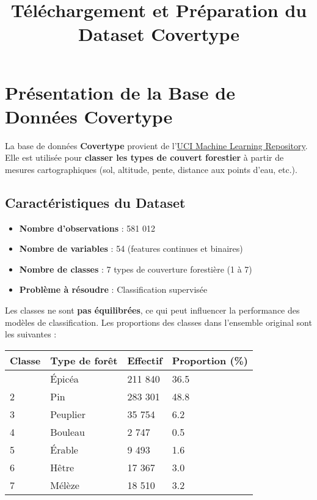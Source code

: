 \documentclass[
]{article}
\title{Téléchargement et Préparation du Dataset Covertype}
\author{}
\date{}
\providecommand{\tightlist}{%
  \setlength{\itemsep}{0pt}\setlength{\parskip}{0pt}}\usepackage{longtable,booktabs,array}
\begin{document}
\maketitle


\section{Présentation de la Base de Données
Covertype}\label{pruxe9sentation-de-la-base-de-donnuxe9es-covertype}

La base de données \textbf{Covertype} provient de
l'\href{https://archive.ics.uci.edu/ml/datasets/Covertype}{UCI Machine
Learning Repository}. Elle est utilisée pour \textbf{classer les types
de couvert forestier} à partir de mesures cartographiques (sol,
altitude, pente, distance aux points d'eau, etc.).

\subsection{Caractéristiques du
Dataset}\label{caractuxe9ristiques-du-dataset}

\begin{itemize}
\tightlist
\item
  \textbf{Nombre d'observations} : 581 012
\item
  \textbf{Nombre de variables} : 54 (features continues et binaires)
\item
  \textbf{Nombre de classes} : 7 types de couverture forestière (1 à 7)
\item
  \textbf{Problème à résoudre} : Classification supervisée
\end{itemize}

Les classes ne sont \textbf{pas équilibrées}, ce qui peut influencer la
performance des modèles de classification. Les proportions des classes
dans l'ensemble original sont les suivantes :

\begin{longtable}[]{@{}llll@{}}
\toprule\noalign{}
Classe & Type de forêt & Effectif & Proportion (\%) \\
\midrule\noalign{}
\endhead
\bottomrule\noalign{}
\endlastfoot
1 & Épicéa & 211 840 & 36.5 \\
2 & Pin & 283 301 & 48.8 \\
3 & Peuplier & 35 754 & 6.2 \\
4 & Bouleau & 2 747 & 0.5 \\
5 & Érable & 9 493 & 1.6 \\
6 & Hêtre & 17 367 & 3.0 \\
7 & Mélèze & 18 510 & 3.2 \\
\end{longtable}
\end{document}
